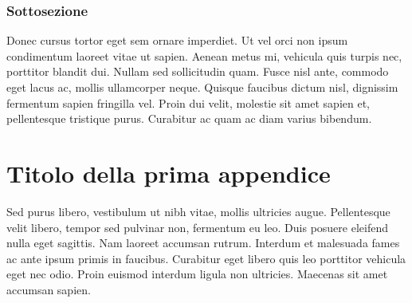 \documentclass[target=mst,aauheader=,style=]{thud}
\begin{document}
\subsection{Sottosezione}
Donec cursus tortor eget sem ornare imperdiet. Ut vel orci non ipsum condimentum laoreet vitae ut sapien. Aenean metus mi, vehicula quis turpis nec, porttitor blandit dui. Nullam sed sollicitudin quam. Fusce nisl ante, commodo eget lacus ac, mollis ullamcorper neque. Quisque faucibus dictum nisl, dignissim fermentum sapien fringilla vel. Proin dui velit, molestie sit amet sapien et, pellentesque tristique purus. Curabitur ac quam ac diam varius bibendum.


\appendix


\chapter{Titolo della prima appendice}
Sed purus libero, vestibulum ut nibh vitae, mollis ultricies augue. Pellentesque velit libero, tempor sed pulvinar non, fermentum eu leo. Duis posuere eleifend nulla eget sagittis. Nam laoreet accumsan rutrum. Interdum et malesuada fames ac ante ipsum primis in faucibus. Curabitur eget libero quis leo porttitor vehicula eget nec odio. Proin euismod interdum ligula non ultricies. Maecenas sit amet accumsan sapien.

\backmatter




\end{document}
